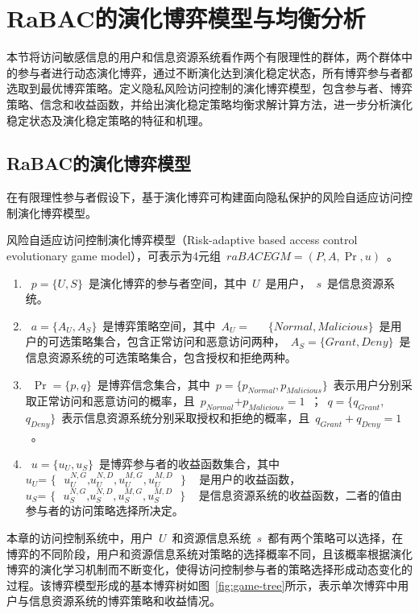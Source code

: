 \section{RaBAC的演化博弈模型与均衡分析}
\label{sec:evolutionary-game-model}
本节将访问敏感信息的用户和信息资源系统看作两个有限理性的群体，两个群体中的参与者进行动态演化博弈，通过不断演化达到演化稳定状态，所有博弈参与者都选取到最优博弈策略。定义隐私风险访问控制的演化博弈模型，包含参与者、博弈策略、信念和收益函数，并给出演化稳定策略均衡求解计算方法，进一步分析演化稳定状态及演化稳定策略的特征和机理。

\subsection{RaBAC的演化博弈模型}
\label{subsec:evolutionary-game-model}
在有限理性参与者假设下，基于演化博弈可构建面向隐私保护的风险自适应访问控制演化博弈模型。
\begin{definition}
	风险自适应访问控制演化博弈模型（Risk-adaptive based access control evolutionary game model），可表示为4元组~$raBACEGM=(P,A,\Pr ,u)$~。
	\begin{enumerate}
		\item ~$p=\{U,S\}$~是演化博弈的参与者空间，其中~$U$~是用户，~$s$~是信息资源系统。
		\item ~$a=\{{{A}_{U}},{{A}_{S}}\}$~是博弈策略空间，其中~${{A}_{U}}=~$~ ~$\{Normal,Malicious\}$~是用户的可选策略集合，包含正常访问和恶意访问两种，~${{A}_{S}}=\{Grant,Deny\}$~是信息资源系统的可选策略集合，包含授权和拒绝两种。
		\item ~$\Pr =\{p,q\}$~是博弈信念集合，其中~$p=\{{{p}_{Normal}},{{p}_{Malicious}}\}$~表示用户分别采取正常访问和恶意访问的概率，且~${{p}_{Normal}}\text{+}{{p}_{Malicious}}=1$~；~$q=\{{{q}_{Grant}},~$~ ~${{q}_{Deny}}\}$~表示信息资源系统分别采取授权和拒绝的概率，且~${{q}_{Grant}}+{{q}_{Deny}}=1$~。
		\item ~$u=\{{{u}_{U}},{{u}_{S}}\}$~是博弈参与者的收益函数集合，其中~${{u}_{U}}\text{= }\!\!\{\!\!\text{ }u_{U}^{N,G}\text{,}u_{U}^{N,D},u_{U}^{M,G},u_{U}^{M,D}\text{ }\!\!\}\!\!\text{ }$~是用户的收益函数，~${{u}_{S}}\text{= }\!\!\{\!\!\text{ }u_{S}^{N,G}\text{,}u_{S}^{N,D},u_{S}^{M,G},u_{S}^{M,D}\text{ }\!\!\}\!\!\text{ }$~是信息资源系统的收益函数，二者的值由参与者的访问策略选择所决定。
		
	\end{enumerate}
\end{definition}

本章的访问控制系统中，用户~$U$~和资源信息系统~$s$~都有两个策略可以选择，在博弈的不同阶段，用户和资源信息系统对策略的选择概率不同，且该概率根据演化博弈的演化学习机制而不断变化，使得访问控制参与者的策略选择形成动态变化的过程。该博弈模型形成的基本博弈树如图~\ref{fig:game-tree}所示，表示单次博弈中用户与信息资源系统的博弈策略和收益情况。

